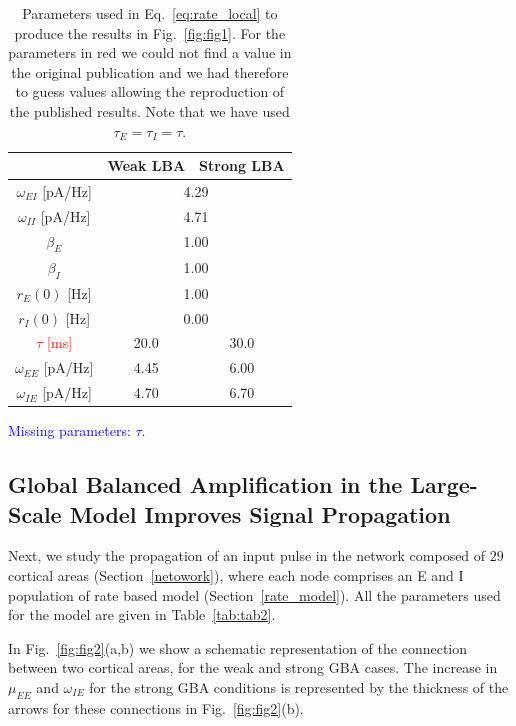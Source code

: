 \begin{table}[!ht]
\centering
\begin{tabular}{|c|c|c|}

\hline
                    & \textbf{Weak LBA} & \textbf{Strong LBA} \\ \hline
$\omega_{EI}$ [pA/Hz] & \multicolumn{2}{c|}{4.29}               \\ \hline
$\omega_{II}$ [pA/Hz] & \multicolumn{2}{c|}{4.71}               \\ \hline
$\beta_{E}$         & \multicolumn{2}{c|}{1.00}               \\ \hline
$\beta_{I}$         & \multicolumn{2}{c|}{1.00}               \\ \hline
$r_E(0)$ [Hz]           & \multicolumn{2}{c|}{1.00}               \\ \hline
$r_I(0)$ [Hz]           & \multicolumn{2}{c|}{0.00}               \\ \hline
\textcolor{red}{$\tau$ [ms]}           & 20.0              & 30.0                \\ \hline
$\omega_{EE}$ [pA/Hz] & 4.45              & 6.00                \\ \hline
$\omega_{IE}$ [pA/Hz] & 4.70              & 6.70                \\ \hline
\end{tabular}
\caption{Parameters used in Eq.~\ref{eq:rate_local} to produce the results in Fig.~\ref{fig:fig1}. For the parameters in red we could not find a value in the original publication and we had therefore to guess values allowing the reproduction of the published results. Note that we have used $\tau_{E} = \tau_{I} = \tau$.}\textcolor{blue}{Missing parameters: $\tau$.}\label{tab:tab1}
\end{table}

\subsection{Global Balanced Amplification
in the Large-Scale Model Improves Signal Propagation}\label{gba_rate}

Next, we study the propagation of an input pulse in the network composed of $29$ cortical areas \cite{markov2014b} (Section~\ref{netowork}), where each node comprises an E and I population of rate based model (Section~\ref{rate_model}). All the parameters used for the model are given in Table~\ref{tab:tab2}.

In Fig.~\ref{fig:fig2}(a,b) we show a schematic representation of the connection between two cortical areas, for the weak and strong GBA cases. The increase in $\mu_{EE}$ and $\omega_{IE}$ for the strong GBA conditions is represented by the thickness of the arrows for these connections in  Fig.~\ref{fig:fig2}(b).

